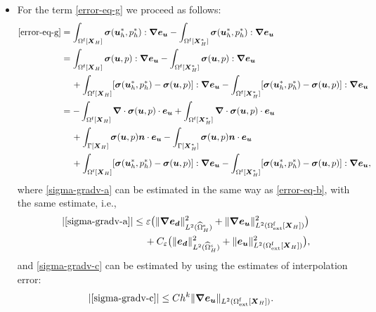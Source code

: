 \documentclass[11pt,reqno]{amsart}
\theoremstyle{definition}
\theoremstyle{plain}
\numberwithin{theorem}{section}
\numberwithin{proposition}{section}
\numberwithin{lemma}{section}
\numberwithin{equation}{section}
\newcommand{\bs}[1]{\boldsymbol{#1}}
\newcommand{\uu}[1]  {{\bs{#1}} }
\newcommand{\dep}{{{\bs{d}}}}
\newcommand{\grad}   { \uu{\nabla}    }
\newcommand{\bu}{\uu{u}}
\renewcommand{\(}{\bigl(}
\renewcommand{\)}{\bigr)}
\begin{document}
\begin{itemize}[leftmargin=20pt]
\item For the term \eqref{error-eq-g} we proceed as follows: 
\begin{subequations}
\begin{align}
\eqref{error-eq-g} 
& = \int_{\Omega^{\rm f}[\bs X_H]} {\bs\sigma}(\bu_h^*,p_h^*): \grad {\bs e}_{\bs u}
- \int_{\Omega^{\rm f}[\bs X_H^*]} {\bs\sigma}(\bu_h^*,p_h^*): \grad {\bs e}_{\bs u} \notag\\
& = \int_{\Omega^{\rm f}[\bs X_H]} {\bs\sigma}(\bu,p): \grad {\bs e}_{\bs u}
- \int_{\Omega^{\rm f}[\bs X_H^*]} {\bs\sigma}(\bu,p): \grad {\bs e}_{\bs u} \notag\\
&\quad\, + \int_{\Omega^{\rm f}[\bs X_H]} [{\bs\sigma}(\bu_h^*,p_h^*) - {\bs\sigma}(\bu,p)] : \grad {\bs e}_{\bs u}
- \int_{\Omega^{\rm f}[\bs X_H^*]} [{\bs\sigma}(\bu_h^*,p_h^*)- {\bs\sigma}(\bu,p)]: \grad {\bs e}_{\bs u} \notag\\
& = - \int_{\Omega^{\rm f}[\bs X_H]} \grad\cdot {\bs\sigma}(\bu,p) \cdot {\bs e}_{\bs u}
+ \int_{\Omega^{\rm f}[\bs X_H^*]} \grad\cdot {\bs\sigma}(\bu,p) \cdot {\bs e}_{\bs u}
\label{sigma-gradv-a} \\
&\quad\, + \int_{\Gamma[\bs X_H]} {\bs\sigma}(\bu,p){\bs n}\cdot {\bs e}_{\bs u}
- \int_{\Gamma[\bs X_H^*]} {\bs\sigma}(\bu,p){\bs n}\cdot {\bs e}_{\bs u}
\label{sigma-gradv-b} \\
&\quad\, + \int_{\Omega^{\rm f}[\bs X_H]} [{\bs\sigma}(\bu_h^*,p_h^*) - {\bs\sigma}(\bu,p)] : \grad {\bs e}_{\bs u}
- \int_{\Omega^{\rm f}[\bs X_H^*]} [{\bs\sigma}(\bu_h^*,p_h^*)- {\bs\sigma}(\bu,p)]: \grad {\bs e}_{\bs u} ,
\label{sigma-gradv-c} 
\end{align}
\end{subequations}
where \eqref{sigma-gradv-a} can be estimated in the same way as \eqref{error-eq-b}, with the same estimate, i.e., 
\begin{align}\label{sigma-gradv-a-est}
|\eqref{sigma-gradv-a}| 
&\le \varepsilon \big( \|\grad {\bs e}_\dep\|_{L^2(\widehat{\Omega}^{\rm s}_H)}^2 +  \|\grad {\bs e}_{\bs u}\|_{L^2(\Omega^{\rm f}_{\rm ext}[\bs X_H])}^2 \big) \notag\\ 
&\quad\, + C_{\varepsilon} \big(\|{\bs e}_\dep\|_{L^2(\widehat{\Omega}^{\rm s}_H)}^2 + \|{\bs e}_{\bs u}\|_{L^2(\Omega^{\rm f}_{\rm ext}[\bs X_H])}^2 \big), 
\end{align}
and \eqref{sigma-gradv-c} can be estimated by using the estimates of interpolation error: 
\begin{align}\label{sigma-gradv-c-est}
|\eqref{sigma-gradv-c}| 
&\le Ch^k \|\grad{\bs e}_{\bs u}\|_{L^2(\Omega^{\rm f}_{\rm ext}[\bs X_H])} .

\end{align}
\end{itemize}
\end{document}
